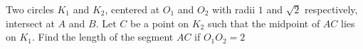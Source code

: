 Two circles $K_{1}$ and $K_{2}$,  centered at $O_{1}$ and $O_{2}$ with radii $1$ and $\sqrt{2}$ respectively, intersect at $A$ and $B$. Let $C$ be a point on $K_{2}$ such that the midpoint of $AC$ lies on $K_{1}$. Find the length of the segment $AC$ if $O_{1}O_{2}=2$
